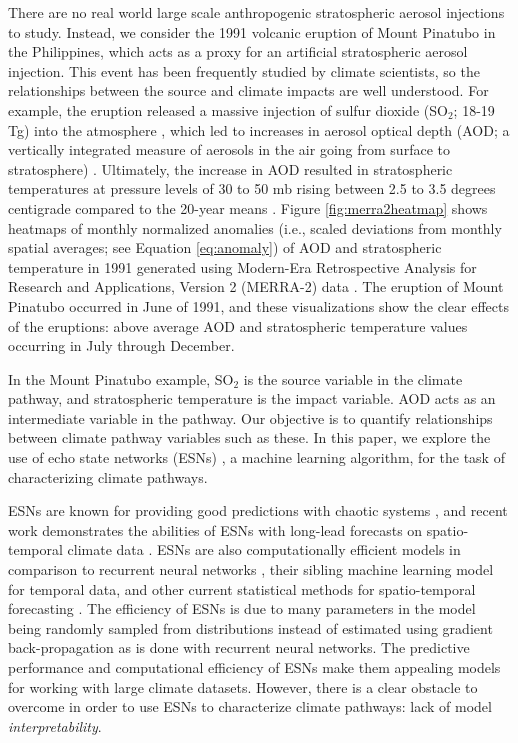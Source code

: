 \documentclass[AMS,STIX2COL]{WileyNJD-v2}
\begin{document}
There are no real world large scale anthropogenic stratospheric aerosol injections to study. Instead, we consider the 1991 volcanic eruption of Mount Pinatubo in the Philippines, which acts as a proxy for an artificial stratospheric aerosol injection. This event has been frequently studied by climate scientists, so the relationships between the source and climate impacts are well understood. For example, the eruption released a massive injection of sulfur dioxide (SO$_2$; 18-19 Tg) into the atmosphere \citep{guo2004}, which led to increases in aerosol optical depth (AOD; a vertically integrated measure of aerosols in the air going from surface to stratosphere) \citep{sato1993, guo2004}. Ultimately, the increase in AOD resulted in stratospheric temperatures at pressure levels of 30 to 50 mb rising between 2.5 to 3.5 degrees centigrade compared to the 20-year means \citep{labitzke1992}. Figure \ref{fig:merra2heatmap} shows heatmaps of monthly normalized anomalies (i.e., scaled deviations from monthly spatial averages; see Equation \eqref{eq:anomaly}) of AOD and stratospheric temperature in 1991 generated using Modern-Era Retrospective Analysis for Research and Applications, Version 2 (MERRA-2) data \citep{gelaro2017}. The eruption of Mount Pinatubo occurred in June of 1991, and these visualizations show the clear effects of the eruptions: above average AOD and stratospheric temperature values occurring in July through December. 

In the Mount Pinatubo example, SO$_2$ is the source variable in the climate pathway, and stratospheric temperature is the impact variable. AOD acts as an intermediate variable in the pathway. Our objective is to quantify relationships between climate pathway variables such as these. In this paper, we explore the use of echo state networks (ESNs) \citep{jaeger2001,lukosevicius2009}, a machine learning algorithm, for the task of characterizing climate pathways. 

ESNs are known for providing good predictions with chaotic systems \citep{alao2021}, and recent work demonstrates the abilities of ESNs with long-lead forecasts on spatio-temporal climate data \citep{mcdermott2017, mcdermott2019}. ESNs are also computationally efficient models in comparison to recurrent neural networks \citep{arrieta2022}, their sibling machine learning model for temporal data, and other current statistical methods for spatio-temporal forecasting \citep{mcdermott2019}. The efficiency of ESNs is due to many parameters in the model being randomly sampled from distributions instead of estimated using gradient back-propagation as is done with recurrent neural networks. The predictive performance and computational efficiency of ESNs make them appealing models for working with large climate datasets. However, there is a clear obstacle to overcome in order to use ESNs to characterize climate pathways: lack of model \emph{interpretability}.
\end{document}
